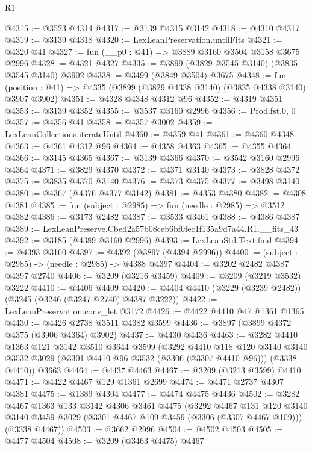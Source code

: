 \begin{lexlean}{R1}
\begin{coremodule}
@4315 := @3523 @4314
@4317 := @3139 @4315 @3142
@4318 := @4310 @4317
@4319 := @3139 @4318
@4320 := LexLeanPreservation.untilFits
@4321 := @4320 @41
@4327 := fun (__p0 : @41) => @3889 @3160 @3504 @3158 @3675 @2996
@4328 := @4321 @4327
@4335 := @3899 (@3829 @3545 @3140) (@3835 @3545 @3140) @3902
@4338 := @3499 (@3849 @3504) @3675
@4348 := fun (position : @41) => @4335 (@3899 (@3829 @4338 @3140) (@3835 @4338 @3140) @3907 @3902)
@4351 := @4328 @4348 @4312 @96
@4352 := @4319 @4351
@4353 := @3139 @4352
@4355 := @3537 @3160 @2996
@4356 := Prod.fst.{0, 0}
@4357 := @4356 @41
@4358 := @4357 @3002
@4359 := LexLeanCollections.iterateUntil
@4360 := @4359 @41
@4361 := @4360 @4348
@4363 := @4361 @4312 @96
@4364 := @4358 @4363
@4365 := @4355 @4364
@4366 := @3145 @4365
@4367 := @3139 @4366
@4370 := @3542 @3160 @2996 @4364
@4371 := @3829 @4370
@4372 := @4371 @3140
@4373 := @3828 @4372
@4375 := @3835 @4370 @3140
@4376 := @4373 @4375
@4377 := @3498 @3140
@4380 := @4367 (@4376 @4377 @3142)
@4381 := @4353 @4380
@4382 := @4308 @4381
@4385 := fun (subject : @2985) => fun (needle : @2985) => @3512 @4382
@4386 := @3173 @2482
@4387 := @3533 @3461
@4388 := @4386 @4387
@4389 := LexLeanPreserve.Cbed2a57b08ceb6bf0fec1f135a9d7a44.R1.__fits_43
@4392 := @3185 (@4389 @3160 @2996)
@4393 := LexLeanStd.Text.find
@4394 := @4393 @3160
@4397 := @4392 (@3897 (@4394 @2996))
@4400 := (subject : @2985) -> (needle : @2985) -> @4388 @4397
@4404 := @3202 @2482 @4387 @4397 @2740
@4406 := @3209 (@3216 @3459)
@4409 := @3209 (@3219 @3532) @3222
@4410 := @4406 @4409
@4420 := @4404 @4410 (@3229 (@3239 @2482)) (@3245 (@3246 (@3247 @2740) @4387 @3222))
@4422 := LexLeanPreservation.conv_let @3172
@4426 := @4422 @4410 @47 @1361 @1365
@4430 := @4426 @2738 @3511 @4382 @3599
@4436 := @3897 (@3899 @4372 @4375 (@3906 @4364) @3902)
@4437 := @4430 @4436
@4463 := @3282
    @4410
    @1363
    @121
    @3142
    @3510
    @3644
    @3599
    (@3292
      @4410
      @118
      @120
      @3140
      @3140
      @3532
      @3029
      (@3301 @4410 @96 @3532 (@3306 (@3307 @4410 @96)))
      (@3338 @4410))
    @3663
@4464 := @4437 @4463
@4467 := @3209 (@3213 @3599) @4410
@4471 := @4422 @4467 @129 @1361 @2699
@4474 := @4471 @2737 @4307 @4381
@4475 := @1389 @4304
@4477 := @4474 @4475 @4436
@4502 := @3282
    @4467
    @1363
    @133
    @3142
    @4306
    @3461
    @4475
    (@3292
      @4467
      @131
      @120
      @3140
      @3140
      @3459
      @3029
      (@3301 @4467 @109 @3459 (@3306 (@3307 @4467 @109)))
      (@3338 @4467))
@4503 := @3662 @2996
@4504 := @4502 @4503
@4505 := @4477 @4504
@4508 := @3209 (@3463 @4475) @4467

\end{coremodule}
\end{lexlean}
